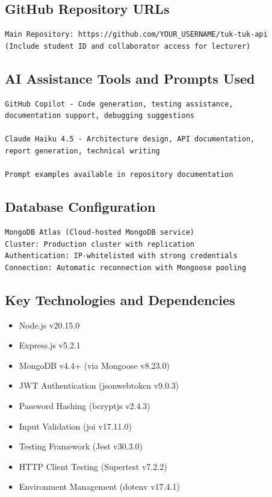 \documentclass[12pt,a4paper]{article}
\begin{document}
\subsection*{GitHub Repository URLs}
\begin{verbatim}
Main Repository: https://github.com/YOUR_USERNAME/tuk-tuk-api
(Include student ID and collaborator access for lecturer)
\end{verbatim}

\subsection*{AI Assistance Tools and Prompts Used}
\begin{verbatim}
GitHub Copilot - Code generation, testing assistance, 
documentation support, debugging suggestions

Claude Haiku 4.5 - Architecture design, API documentation, 
report generation, technical writing

Prompt examples available in repository documentation
\end{verbatim}

\subsection*{Database Configuration}
\begin{verbatim}
MongoDB Atlas (Cloud-hosted MongoDB service)
Cluster: Production cluster with replication
Authentication: IP-whitelisted with strong credentials
Connection: Automatic reconnection with Mongoose pooling
\end{verbatim}

\subsection*{Key Technologies and Dependencies}
\begin{itemize}
\item Node.js v20.15.0
\item Express.js v5.2.1
\item MongoDB v4.4+ (via Mongoose v8.23.0)
\item JWT Authentication (jsonwebtoken v9.0.3)
\item Password Hashing (bcryptjs v2.4.3)
\item Input Validation (joi v17.11.0)
\item Testing Framework (Jest v30.3.0)
\item HTTP Client Testing (Supertest v7.2.2)
\item Environment Management (dotenv v17.4.1)
\end{itemize}
\end{document}

